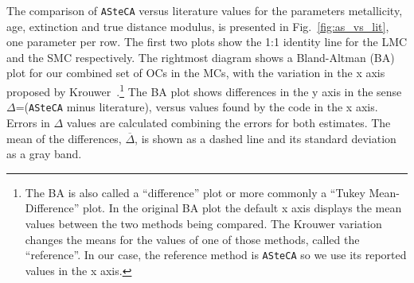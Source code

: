 \documentclass{aa}
\begin{document}
The comparison of \texttt{ASteCA} versus literature values for the parameters
metallicity, age, extinction and true distance modulus, is presented in
Fig.~\ref{fig:as_vs_lit}, one parameter per row. The first two plots show the
1:1 identity line for the LMC and the SMC respectively.
%
The rightmost diagram shows a Bland-Altman (BA) plot for our combined set of
OCs in the MCs, with the variation in the
x axis proposed by Krouwer~\citep{Bland_1986,Krouwer_2008}.\footnote{The BA is
also called a ``difference'' plot or more commonly a ``Tukey Mean-Difference''
plot. In the original BA plot the default x axis displays the mean values
between the two methods being compared. The Krouwer variation changes the means
for the values of one of those methods, called the ``reference''. In our case,
the reference method is \texttt{ASteCA} so we use its reported values in the x
axis.}
%
The BA plot shows differences in the y axis in the sense $\Delta$=(\texttt
{ASteCA} minus literature), versus values found by the code in the x axis. Errors
in $\Delta$ values are calculated combining the errors for both estimates. The
mean of the differences, $\overline{\Delta}$, is shown as a dashed line and its
standard deviation as a gray band.\\
\end{document}

